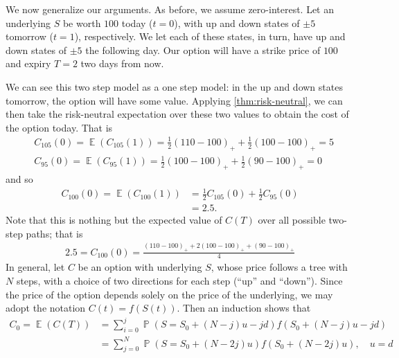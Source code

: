 \documentclass[12pt]{amsbook}
\DeclareMathOperator{\ex}{\mathbb{E}}
\DeclareMathOperator{\prob}{\mathbb{P}}
\theoremstyle{plain}
\theoremstyle{definition}
\theoremstyle{remark}
\numberwithin{equation}{section}  %
\begin{document}
We now generalize our arguments. 
As before, we assume zero-interest. Let an underlying $S$ be worth
$100$ today ($t=0$), with up and down states of $\pm 5$ tomorrow ($t=1$), respectively.  We let each of these states, in turn, have up and down states of
$\pm 5$ the following day. Our option will have a strike price of $100$
and expiry $T = 2$ two days from now. 

We can see this two step model as a one step model: in the up and down states
tomorrow, the option will have some value. Applying 
\cref{thm:risk-neutral}, we can then take the risk-neutral 
expectation over these two values to obtain the cost of the option today.
That is
\begin{equation*}
	\begin{split}
		& C_{105}(0) = \ex(C_{105}(1)) = \frac{1}{2}{(110 - 100)}_{+} +
		\frac{1}{2}{(100 - 100)}_{+} = 5
		\\
		& C_{95}(0) = \ex(C_{95}(1)) = \frac{1}{2}{(100 - 100)}_{+} +
		\frac{1}{2}{(90 - 100)}_{+} = 0
	\end{split}
\end{equation*}
and so
\begin{equation*}
	\begin{split}
		C_{100}(0) = \ex(C_{100}(1))
		& = \frac{1}{2}C_{105}(0) + \frac{1}{2} C_{95}(0)
		\\
		& = 2.5.
	\end{split}
\end{equation*}
Note that this is nothing but the expected value
of $C(T)$ over all possible two-step paths; that is
\begin{equation*}
	\begin{split}
		2.5 = C_{100}(0) = \frac{{(110-100)}_{+} + 2 {(100 - 100)}_{+} + {(90 - 100)}_{+}}{4}
	\end{split}
\end{equation*}
In general, let $C$ be an option with underlying $S$, whose price follows
a tree with $N$ steps, with a choice of two
directions for each step (``up'' and ``down'').
Since the price of the option depends solely on the price of the
underlying, we may adopt the notation $C(t) = f(S(t))$. Then
an induction shows that
\begin{equation*}
	\begin{split}
		C_{0} = \ex(C(T)) & =  \sum_{i = 0}^{j}\prob(S = S_{0} + (N-j)u - jd)
		f(S_{0} + (N-j)u - jd)
		\\
		& = \sum_{j = 0}^{N}\prob(S = S_{0} + (N-2j)u)
		f(S_{0} + (N-2j)u), \quad u = d
	\end{split}
\end{equation*}
\end{document}
